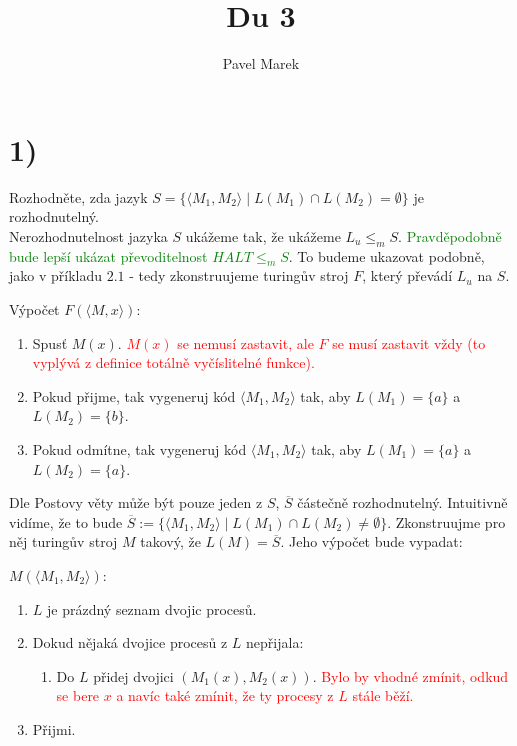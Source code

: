 \documentclass{article}
\begin{document}
\title{Du 3}
\author{Pavel Marek}
\date{}

\maketitle

\section*{1)}
Rozhodněte, zda jazyk $S = \{\langle M_1, M_2 \rangle \mid
L(M_1) \cap L(M_2) = \emptyset\}$ je rozhodnutelný. \\

Nerozhodnutelnost jazyka $S$ ukážeme tak, že ukážeme $L_u \leq_m S$.
\textcolor{green}{Pravděpodobně bude lepší ukázat převoditelnost 
$HALT \leq_m S$}.
To budeme ukazovat podobně, jako v příkladu $2.1$ - tedy zkonstruujeme
turingův stroj $F$, který převádí $L_u$ na $S$.

Výpočet $F(\langle M, x \rangle)$:
\begin{enumerate}
  \item Spusť $M(x)$. \textcolor{red}{$M(x)$ se nemusí zastavit, ale $F$ se
  musí zastavit vždy (to vyplývá z definice totálně vyčíslitelné funkce).}
  \item Pokud přijme, tak vygeneruj kód $\langle M_1, M_2 \rangle$ tak, aby
  $L(M_1) = \{a\}$ a $L(M_2) = \{b\}$.
  \item Pokud odmítne, tak vygeneruj kód $\langle M_1, M_2 \rangle$ tak, aby
  $L(M_1) = \{a\}$ a $L(M_2) = \{a\}$.\\
\end{enumerate}

Dle Postovy věty může být pouze jeden z $S$, $\overline{S}$ částečně
rozhodnutelný. Intuitivně vidíme, že to bude $\overline{S} :=
\{\langle M_1, M_2 \rangle \mid L(M_1) \cap L(M_2) \neq \emptyset\}$.
Zkonstruujme pro něj turingův stroj $M$ takový, že $L(M) = \overline{S}$.
Jeho výpočet bude vypadat:

$M(\langle M_1, M_2 \rangle)$:
\begin{enumerate}
  \item $L$ je prázdný seznam dvojic procesů.
  \item Dokud nějaká dvojice procesů z $L$ nepřijala:
  \begin{enumerate}
    \item Do $L$ přidej dvojici $(M_1(x), M_2(x))$. \textcolor{red}{Bylo
    by vhodné zmínit, odkud se bere $x$ a navíc také zmínit, že ty procesy
    z $L$ stále běží.}
  \end{enumerate}
  \item Přijmi.
\end{enumerate}
\end{document}
